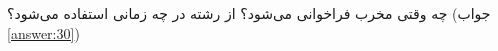 \section{}
\paragraph{}\label{hint:23}
چه وقتی مخرب  فراخوانی می‌شود؟ از رشته در چه زمانی استفاده می‌شود؟ (جواب \ref{answer:30})